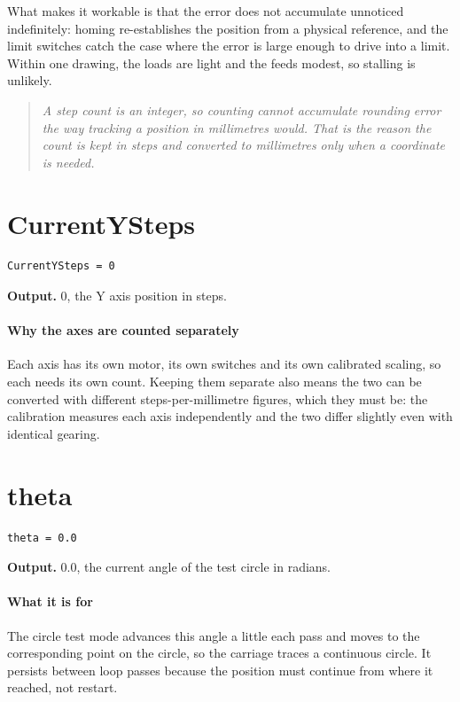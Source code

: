 What makes it workable is that the error does not accumulate unnoticed indefinitely: homing re-establishes the position from a physical reference, and the limit switches catch the case where the error is large enough to drive into a limit. Within one drawing, the loads are light and the feeds modest, so stalling is unlikely.


\begin{quote}\small\itshape A step count is an integer, so counting cannot accumulate rounding error the way tracking a position in millimetres would. That is the reason the count is kept in steps and converted to millimetres only when a coordinate is needed.\end{quote}

\section{CurrentYSteps}
\begin{lstlisting}[style=sig]
CurrentYSteps = 0
\end{lstlisting}

\noindent\textbf{Output.} 0, the Y axis position in steps.


\paragraph{Why the axes are counted separately}
Each axis has its own motor, its own switches and its own calibrated scaling, so each needs its own count. Keeping them separate also means the two can be converted with different steps-per-millimetre figures, which they must be: the calibration measures each axis independently and the two differ slightly even with identical gearing.


\section{theta}
\begin{lstlisting}[style=sig]
theta = 0.0
\end{lstlisting}

\noindent\textbf{Output.} 0.0, the current angle of the test circle in radians.


\paragraph{What it is for}
The circle test mode advances this angle a little each pass and moves to the corresponding point on the circle, so the carriage traces a continuous circle. It persists between loop passes because the position must continue from where it reached, not restart.


